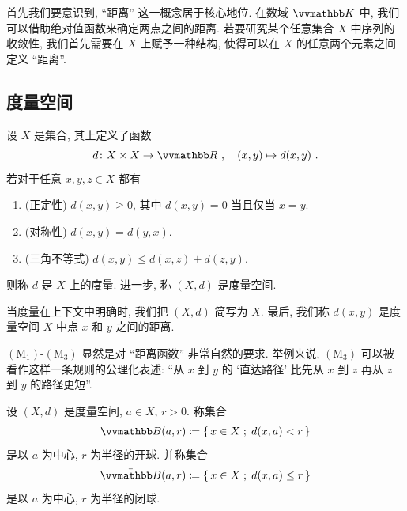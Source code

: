 首先我们要意识到, ``距离'' 这一概念居于核心地位. 在数域 \(\K\) 中, 我们可以借助绝对值函数来确定两点之间的距离. 若要研究某个任意集合 \(X\) 中序列的收敛性, 我们首先需要在 \(X\) 上赋予一种结构, 使得可以在 \(X\) 的任意两个元素之间定义 ``距离''.

\subsection{度量空间}

\begin{axiom}[度量]\label{ax:metric}
    设 \(X\) 是集合, 其上定义了函数
    \[
        d \colon X \times X \to \R\ ,\quad (x, y) \mapsto d(x, y)\ .
    \]
    若对于任意 \(x, y, z \in X\) 都有
    \begin{enumerate}[label={\((\mathrm M_{\arabic*})\)}]
        \item (正定性) \(d(x, y) \geq 0\), 其中 \(d(x, y) = 0\) 当且仅当 \(x = y\).
        \item (对称性) \(d(x, y) = d(y, x)\).
        \item (三角不等式) \(d(x, y) \leq d(x, z) + d(z, y)\).
    \end{enumerate}
    则称 \(d\) 是 \(X\) 上的度量. 进一步, 称 \((X, d)\) 是度量空间.
\end{axiom}

当度量在上下文中明确时, 我们把 \((X, d)\) 简写为 \(X\). 最后, 我们称 \(d(x, y)\) 是度量空间 \(X\) 中点 \(x\) 和 \(y\) 之间的距离.

\hyperref[ax:metric]{\((\mathrm M_1)\)}-\hyperref[ax:metric]{\((\mathrm M_3)\)} 显然是对 ``距离函数'' 非常自然的要求. 举例来说, \hyperref[ax:metric]{\((\mathrm M_3)\)} 可以被看作这样一条规则的公理化表述: ``从 \(x\) 到 \(y\) 的 `直达路径' 比先从 \(x\) 到 \(z\) 再从 \(z\) 到 \(y\) 的路径更短''.

\begin{definition}[开球和闭球]
    设 \((X, d)\) 是度量空间, \(a \in X\), \(r > 0\). 称集合
    \[
        \B(a, r) \coloneqq \{\, x \in X \;;\; d(x, a) < r \,\}
    \]
    是以 \(a\) 为中心, \(r\) 为半径的开球. 并称集合
    \[
        \bar \B(a, r) \coloneqq \{\, x \in X \;;\; d(x, a) \leq r \,\}
    \]
    是以 \(a\) 为中心, \(r\) 为半径的闭球.
\end{definition}

